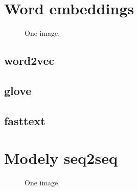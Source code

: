 \section{Word embeddings}
\begin{figure}
    \begin{center}
    \end{center}
	\caption{One image. }
	\label{img:TODO}
\end{figure}
\subsection{word2vec}
\subsection{glove}
\subsection{fasttext}

\section{Modely seq2seq}
\begin{figure}
    \begin{center}
    \end{center}
	\caption{One image. }
	\label{img:TODO}
\end{figure}
